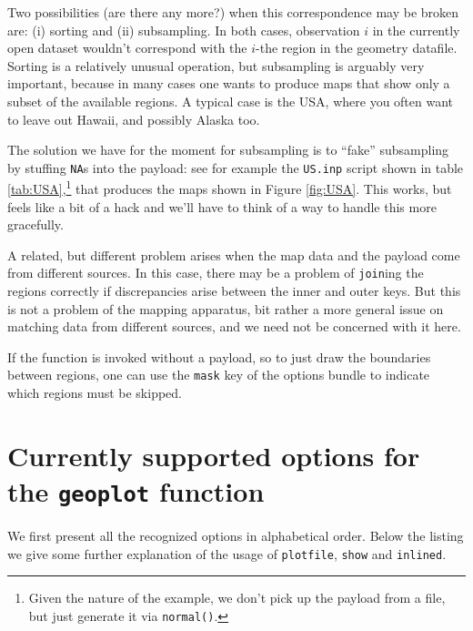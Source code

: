 \documentclass{article}
\begin{document}
Two possibilities (are there any more?) when this correspondence may
be broken are: (i) sorting and (ii) subsampling. In both cases,
observation $i$ in the currently open dataset wouldn't correspond with
the $i$-the region in the geometry datafile. Sorting is a relatively
unusual operation, but subsampling is arguably very important, because
in many cases one wants to produce maps that show only a subset of the
available regions. A typical case is the USA, where you often want to
leave out Hawaii, and possibly Alaska too.

The solution we have for the moment for subsampling is to ``fake''
subsampling by stuffing \texttt{NA}s into the payload: see for example
the \texttt{US.inp} script shown in table
\ref{tab:USA},\footnote{Given the nature of the example, we don't pick
  up the payload from a file, but just generate it via
  \texttt{normal()}.}  that produces the maps shown in Figure
\ref{fig:USA}. This works, but feels like a bit of a hack and we'll
have to think of a way to handle this more gracefully.

A related, but different problem arises when the map data and the
payload come from different sources. In this case, there may be a
problem of \texttt{join}ing the regions correctly if discrepancies
arise between the inner and outer keys. But this is not a problem of
the mapping apparatus, bit rather a more general issue on matching
data from different sources, and we need not be concerned with it
here.

If the  function is invoked without a payload, so to just
draw the boundaries between regions, one can use the \texttt{mask} key
of the options bundle to indicate which regions must be skipped.

\section{Currently supported options for the \texttt{geoplot} function}
\label{sec:opts}

We first present all the recognized options in alphabetical
order. Below the listing we give some further explanation of the usage
of \texttt{plotfile}, \texttt{show} and \texttt{inlined}.
\end{document}
